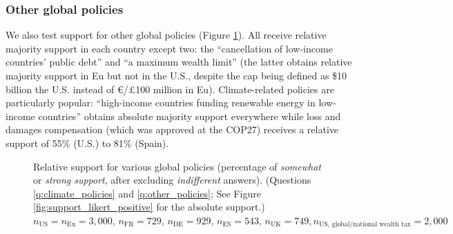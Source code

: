 \subsubsection{Other global policies} %
We also test support for other %
global policies (Figure \ref{fig:support}). All receive relative majority support in each country except two:  the ``cancellation of low-income countries' public debt'' and ``a maximum wealth limit'' (the latter obtains relative majority support in Eu but not in the U.S., despite the cap being defined as \$10 billion the U.S. instead of \euro{}/£100 million in Eu). Climate-related policies are particularly popular: ``high-income countries funding renewable energy in low-income countries'' obtains absolute majority support everywhere while loss and damages compensation (which was approved at the COP27) receives a relative support of 55\% (U.S.) to 81\% (Spain).

\begin{figure}
  \caption[Relative support for various global policies]{Relative support for various global policies (percentage of \textit{somewhat} or \textit{strong support}, after excluding \textit{indifferent} answers). (Questions \ref{q:climate_policies} and \ref{q:other_policies}; See Figure \ref{fig:support_likert_positive} for the absolute support.) $n_\text{US} = n_\text{Eu} = 3,000,\, n_\text{FR} = 729,\, n_\text{DE} = 929,\, n_\text{ES} = 543,\, n_\text{UK} = 749, n_\text{US, global/national wealth tax} = 2,000$} %
  \label{fig:support}
\end{figure} 

